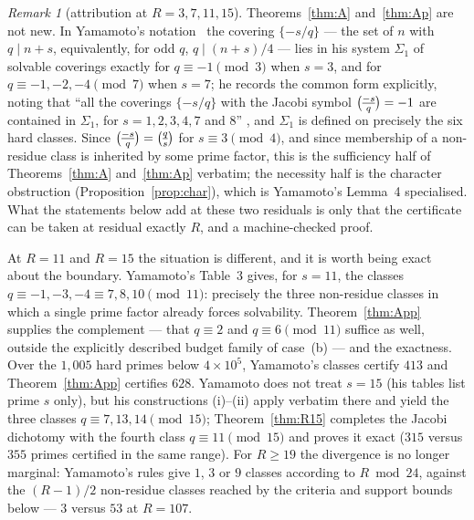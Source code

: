 \documentclass[11pt]{article}
\theoremstyle{plain}
\theoremstyle{remark}
\newtheorem{remark}[theorem]{Remark}
\theoremstyle{plain}
\numberwithin{equation}{section}
\newcommand{\legendre}[2]{\genfrac{(}{)}{}{1}{#1}{#2}}
\begin{document}
\begin{remark}[attribution at $R = 3, 7, 11, 15$]\label{rem:yamamoto}
Theorems~\ref{thm:A} and~\ref{thm:Ap} are not new. In
Yamamoto's notation~\cite[\S3]{Yamamoto} the covering
$\{-s/q\}$ --- the set of $n$ with $q \mid n+s$, equivalently, for
odd $q$, $q \mid (n+s)/4$ --- lies in his system $\Sigma_1$ of
solvable coverings exactly for
$q \equiv -1 \pmod 3$ when $s = 3$, and for
$q \equiv -1, -2, -4 \pmod 7$ when $s = 7$; he records the
common form explicitly, noting that ``all the coverings $\{-s/q\}$
with the Jacobi symbol $\smash{\legendre{-s}{q}} = -1$ are contained
in $\Sigma_1$, for $s = 1, 2, 3, 4, 7$ and $8$''
\cite[p.~45]{Yamamoto}, and $\Sigma_1$ is defined on precisely the
six hard classes. Since $\smash{\legendre{-s}{q}} =
\smash{\legendre{q}{s}}$ for $s \equiv 3 \pmod 4$, and since
membership of a non-residue class is inherited by some prime factor,
this is the sufficiency half of Theorems~\ref{thm:A} and~\ref{thm:Ap}
verbatim; the necessity half is the character obstruction
(Proposition~\ref{prop:char}), which is Yamamoto's Lemma~4
specialised. What the statements below add at these two residuals is
only that the certificate can be taken at residual exactly $R$, and
a machine-checked proof.

At $R = 11$ and $R = 15$ the situation is different, and it is worth
being exact about the boundary. Yamamoto's Table~3
\cite[p.~45]{Yamamoto} gives, for $s = 11$, the classes
$q \equiv -1, -3, -4 \equiv 7, 8, 10 \pmod{11}$: precisely the three
non-residue classes in which a single prime factor already forces
solvability. Theorem~\ref{thm:App} supplies the complement --- that
$q \equiv 2$ and $q \equiv 6 \pmod{11}$ suffice as well, outside the
explicitly described budget family of case~(b) --- and the exactness.
Over the $1{,}005$ hard primes below $4 \times 10^5$, Yamamoto's
classes certify $413$ and Theorem~\ref{thm:App} certifies $628$.
Yamamoto does not treat $s = 15$ (his tables list prime $s$ only),
but his constructions (i)--(ii) apply verbatim there and yield the
three classes $q \equiv 7, 13, 14 \pmod{15}$;
Theorem~\ref{thm:R15} completes the Jacobi dichotomy with the fourth
class $q \equiv 11 \pmod{15}$ and proves it exact ($315$ versus
$355$ primes certified in the same range). For $R \ge 19$ the
divergence is no longer marginal: Yamamoto's rules give $1$, $3$ or
$9$ classes according to $R \bmod 24$, against the $(R-1)/2$
non-residue classes reached by the criteria and support bounds
below --- $3$ versus $53$ at $R = 107$.
\end{remark}
\end{document}

